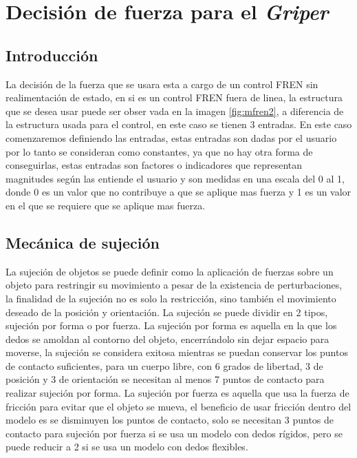     \chapter{Decisión de fuerza para el \textit{Griper}}
    \section{Introducción}
    La decisión de la fuerza que se usara esta a cargo de un control FREN sin realimentación de estado, en si es un control FREN fuera de linea, la estructura que se desea usar puede ser obser vada en la imagen \ref{fig:mfren2}, a diferencia de la estructura usada para el control, en este caso se tienen 3 entradas. %
    En este caso comenzaremos definiendo las entradas, estas entradas son dadas por el usuario por lo tanto se consideran como constantes, ya que no hay otra forma de conseguirlas, estas entradas son factores o indicadores que representan magnitudes según las entiende el usuario y son medidas en una escala del 0 al 1, donde 0 es un valor que no contribuye a que se aplique mas fuerza y 1 es un valor en el que se requiere que se aplique mas fuerza.
    
    \section{Mecánica de sujeción}
    
    La sujeción de objetos se puede definir como la aplicación de fuerzas sobre un objeto para restringir su movimiento a pesar de la existencia de perturbaciones, la finalidad de la sujeción no es solo la restricción, sino también el movimiento deseado de la posición y orientación.
    La sujeción se puede dividir en 2 tipos, sujeción por forma o por fuerza. La sujeción por forma es aquella en la que los dedos se amoldan al contorno del objeto, encerrándolo sin dejar espacio para moverse, la sujeción se considera exitosa mientras se puedan conservar los puntos de contacto suficientes, para un cuerpo libre, con 6 grados de libertad, 3 de posición y 3 de orientación se necesitan al menos 7 puntos de contacto para realizar sujeción por forma.
    La sujeción por fuerza es aquella que usa la fuerza de fricción para evitar que el objeto se mueva, el beneficio de usar fricción dentro del modelo es se disminuyen los puntos de contacto, solo se necesitan 3 puntos de contacto para sujeción por fuerza si se usa un modelo con dedos rígidos, pero se puede reducir a 2 si se usa un modelo con dedos flexibles.
    

